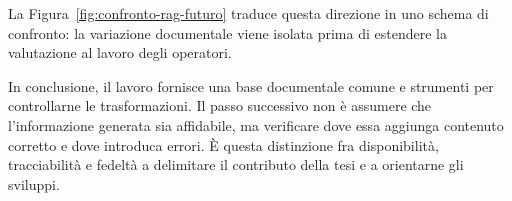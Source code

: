 La Figura~\ref{fig:confronto-rag-futuro} traduce questa direzione in uno schema di confronto: la variazione documentale viene isolata prima di estendere la valutazione al lavoro degli operatori.



In conclusione, il lavoro fornisce una base documentale comune e strumenti per controllarne le trasformazioni. Il passo successivo non è assumere che l'informazione generata sia affidabile, ma verificare dove essa aggiunga contenuto corretto e dove introduca errori. È questa distinzione fra disponibilità, tracciabilità e fedeltà a delimitare il contributo della tesi e a orientarne gli sviluppi.